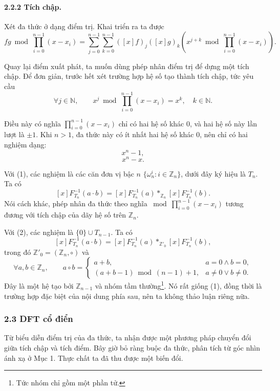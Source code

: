 \documentclass[11pt]{article}
\begin{document}
\paragraph{2.2.2 Tích chập.}
Xét đa thức ở dạng điểm trị. Khai triển ra ta được
\[
  fg\bmod\prod_{i=0}^{n-1}(x-x_i)
  =
  \sum_{j=0}^{n-1}\sum_{k=0}^{n-1}
  ([x]f)_j([x]g)_k
  \left(x^{j+k}\bmod\prod_{i=0}^{n-1}(x-x_i)\right).
\]

Quay lại điểm xuất phát, ta muốn dùng phép nhân điểm trị để dựng một tích chập.
Để đơn giản, trước hết xét trường hợp hệ số tạo thành tích chập, tức yêu cầu
\[
  \forall j\in\mathbb N,\qquad
  x^j\bmod\prod_{i=0}^{n-1}(x-x_i)=x^k,\quad k\in\mathbb N.
\]

Điều này có nghĩa \(\prod_{i=0}^{n-1}(x-x_i)\) chỉ có hai hệ số khác \(0\), và
hai hệ số này lần lượt là \(\pm1\). Khi \(n>1\), đa thức này có ít nhất hai hệ
số khác \(0\), nên chỉ có hai nghiệm dạng:
\[
  x^n-1, \tag{1}
\]
\[
  x^n-x. \tag{2}
\]

Với (1), các nghiệm là các căn đơn vị bậc \(n\)
\(\{\omega_n^i:i\in\mathbb Z_n\}\), dưới đây ký hiệu là \(T_n\). Ta có
\[
  [x]F_{T_n}^{-1}(a\cdot b)
  =
  [x]F_{T_n}^{-1}(a)*_{\mathbb Z_n}[x]F_{T_n}^{-1}(b).
\]
Nói cách khác, phép nhân đa thức theo nghĩa
\(\bmod\prod_{i=0}^{n-1}(x-x_i)\) tương đương với tích chập của dãy hệ số trên
\(\mathbb Z_n\).

Với (2), các nghiệm là \(\{0\}\cup T_{n-1}\). Ta có
\[
  [x]F_{T_n}^{-1}(a\cdot b)
  =
  [x]F_{T_n}^{-1}(a)*_{\mathbb Z'_0}[x]F_{T_n}^{-1}(b),
\]
trong đó \(\mathbb Z'_0=(\mathbb Z_n,\circ)\) và
\[
  \forall a,b\in\mathbb Z_n,\qquad
  a\circ b=
  \begin{cases}
    a+b, & a=0\land b=0,\\
    (a+b-1)\bmod(n-1)+1, & a\ne0\lor b\ne0.
  \end{cases}
\]
Đây là một hệ tạo bởi \(\mathbb Z_{n-1}\) và nhóm tầm thường\footnote{Tức nhóm
chỉ gồm một phần tử.}. Nó rất giống (1), đồng thời là trường hợp đặc biệt của
nội dung phía sau, nên ta không thảo luận riêng nữa.

\subsubsection*{2.3 DFT cổ điển}

Từ biểu diễn điểm trị của đa thức, ta nhận được một phương pháp chuyển đổi giữa
tích chập và tích điểm. Bây giờ bỏ ràng buộc đa thức, phân tích từ góc nhìn ánh
xạ ở Mục 1. Thực chất ta đã thu được một biến đổi.
\end{document}
